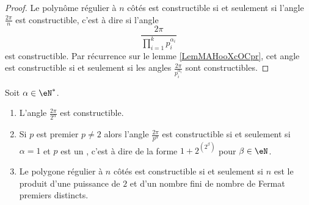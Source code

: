 \begin{proof}
    Le polynôme régulier à \( n\) côtés est constructible si et seulement si l'angle \( \frac{ 2\pi }{ n }\) est constructible, c'est à dire si l'angle
    \begin{equation}
        \frac{ 2\pi }{ \prod_{i=1}^kp_i^{\alpha_i} }
    \end{equation}
    est constructible. Par récurrence sur le lemme \ref{LemMAHooXcOCpr}, cet angle est constructible si et seulement si les angles \( \frac{ 2\pi }{ p_i^{\alpha_i} }\) sont constructibles.
\end{proof}

\begin{theorem}    \label{ThoTWAooEsLjJu}
    Soit \( \alpha\in \eN^*\).
    \begin{enumerate}
        \item   \label{ItemFSEooONDFrSi}
            L'angle \( \frac{ 2\pi }{ 2^{\alpha} } \) est constructible.
        \item\label{ItemFSEooONDFrSii}
            Si \( p\) est premier \( p\neq 2\) alors l'angle \( \frac{ 2\pi }{ p^{\alpha} } \) est constructible si et seulement si \( \alpha=1\) et \( p\) est un , c'est à dire de la forme \( 1+2^{(2^{\beta})}\) pour \( \beta\in \eN\).
        \item\label{ItemFSEooONDFrSiii}
            Le polygone régulier à \( n\) côtés est constructible si et seulement si \( n \) est le produit d'une puissance de \( 2\) et d'un nombre fini de nombre de Fermat premiers distincts.
    \end{enumerate}
\end{theorem}


